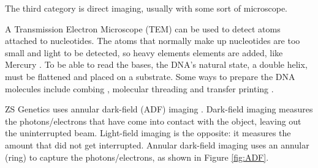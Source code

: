 \documentclass[../main/thesis.tex]{subfiles}
\begin{document}

The third category is direct imaging, usually with some sort of microscope.

A Transmission Electron Microscope (TEM) can be used to detect atoms attached to nucleotides.
The atoms that normally make up nucleotides are too small and light to be detected, so heavy elements elements are added, like Mercury \cite{tem}.
To be able to read the bases, the DNA's natural state, a double helix, must be flattened and placed on a substrate.
Some ways to prepare the DNA molecules include combing \cite{combing1}\cite{combing2}, molecular threading \cite{molecular_threading} and transfer printing \cite{transfer_printing}.


ZS Genetics uses annular dark-field (ADF) imaging \cite{ADF}.
Dark-field imaging measures the photons/electrons that have come into contact with the object, leaving out the uninterrupted beam.
Light-field imaging is the opposite: it measures the amount that did not get interrupted.
Annular dark-field imaging uses an annular (ring) to capture the photons/electrons, as shown in Figure \ref{fig:ADF}.




\end{document}
